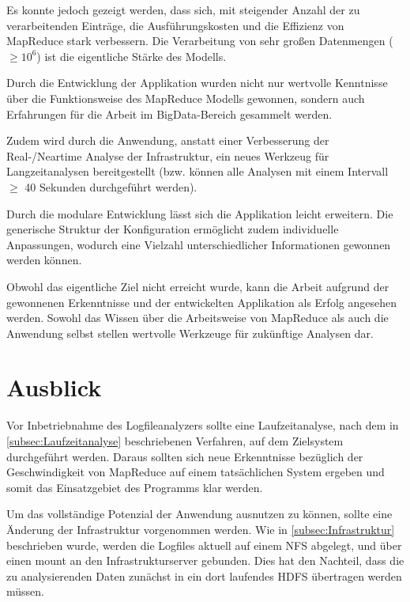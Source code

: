 Es konnte jedoch gezeigt werden, dass sich, mit steigender Anzahl der zu verarbeitenden Einträge, die Ausführungskosten und die Effizienz von MapReduce stark verbessern. Die Verarbeitung von sehr großen Datenmengen ($\geq10^6$) ist die eigentliche Stärke des Modells.

Durch die Entwicklung der Applikation wurden nicht nur wertvolle Kenntnisse über die Funktionsweise des MapReduce Modells gewonnen, sondern auch Erfahrungen für die Arbeit im BigData-Bereich gesammelt werden.

Zudem wird durch die Anwendung, anstatt einer Verbesserung der Real-/Neartime Analyse der Infrastruktur, ein neues Werkzeug für Langzeitanalysen bereitgestellt (bzw. können alle Analysen mit einem Intervall $\geq$ 40 Sekunden durchgeführt werden).

Durch die modulare Entwicklung lässt sich die Applikation leicht erweitern. Die generische Struktur der Konfiguration ermöglicht zudem individuelle Anpassungen, wodurch eine Vielzahl unterschiedlicher Informationen gewonnen werden können.

Obwohl das eigentliche Ziel nicht erreicht wurde, kann die Arbeit aufgrund der gewonnenen Erkenntnisse und der entwickelten Applikation als Erfolg angesehen werden. Sowohl das Wissen über die Arbeitsweise von MapReduce als auch die Anwendung selbst stellen wertvolle Werkzeuge für zukünftige Analysen dar.


\newpage
\section{Ausblick}\label{sec:Ausblick}
Vor Inbetriebnahme des Logfileanalyzers sollte eine Laufzeitanalyse, nach dem in \autoref{subsec:Laufzeitanalyse} beschriebenen Verfahren, auf dem Zielsystem durchgeführt werden. Daraus sollten sich neue Erkenntnisse bezüglich der Geschwindigkeit von MapReduce auf einem tatsächlichen System ergeben und somit das Einsatzgebiet des Programms klar werden.

Um das vollständige Potenzial der Anwendung ausnutzen zu können, sollte eine Änderung der Infrastruktur vorgenommen werden. Wie in \autoref{subsec:Infrastruktur} beschrieben wurde, werden die Logfiles aktuell auf einem \ac{NFS} abgelegt, und über einen mount an den Infrastrukturserver gebunden. Dies hat den Nachteil, dass die zu analysierenden Daten zunächst in ein dort laufendes \ac{HDFS} übertragen werden müssen.

